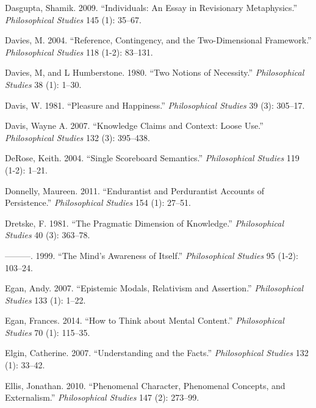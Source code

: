 \documentclass[
  10pt,
  letterpaper,
  DIV=11,
  numbers=noendperiod,
  twoside]{scrartcl}
\newlength{\cslhangindent}
\newenvironment{CSLReferences}[2] %
 {\begin{list}{}{%
  \setlength{\itemindent}{0pt}
  \setlength{\leftmargin}{0pt}
  \setlength{\parsep}{0pt}
  \ifodd #1
   \setlength{\leftmargin}{\cslhangindent}
   \setlength{\itemindent}{-1\cslhangindent}
  \fi
  \setlength{\itemsep}{#2\baselineskip}}}
 {\end{list}}
\begin{document}
\begin{CSLReferences}{1}{0}
Dasgupta, Shamik. 2009. {``Individuals: An Essay in Revisionary
Metaphysics.''} \emph{Philosophical Studies} 145 (1): 35--67.

Davies, M. 2004. {``Reference, Contingency, and the Two-Dimensional
Framework.''} \emph{Philosophical Studies} 118 (1-2): 83--131.

Davies, M, and L Humberstone. 1980. {``Two Notions of Necessity.''}
\emph{Philosophical Studies} 38 (1): 1--30.

Davis, W. 1981. {``Pleasure and Happiness.''} \emph{Philosophical
Studies} 39 (3): 305--17.

Davis, Wayne A. 2007. {``Knowledge Claims and Context: Loose Use.''}
\emph{Philosophical Studies} 132 (3): 395--438.

DeRose, Keith. 2004. {``Single Scoreboard Semantics.''}
\emph{Philosophical Studies} 119 (1-2): 1--21.

Donnelly, Maureen. 2011. {``Endurantist and Perdurantist Accounts of
Persistence.''} \emph{Philosophical Studies} 154 (1): 27--51.

Dretske, F. 1981. {``The Pragmatic Dimension of Knowledge.''}
\emph{Philosophical Studies} 40 (3): 363--78.

---------. 1999. {``The Mind's Awareness of Itself.''}
\emph{Philosophical Studies} 95 (1-2): 103--24.

Egan, Andy. 2007. {``Epistemic Modals, Relativism and Assertion.''}
\emph{Philosophical Studies} 133 (1): 1--22.

Egan, Frances. 2014. {``How to Think about Mental Content.''}
\emph{Philosophical Studies} 70 (1): 115--35.

Elgin, Catherine. 2007. {``Understanding and the Facts.''}
\emph{Philosophical Studies} 132 (1): 33--42.

Ellis, Jonathan. 2010. {``Phenomenal Character, Phenomenal Concepts, and
Externalism.''} \emph{Philosophical Studies} 147 (2): 273--99.


\end{CSLReferences}
\end{document}
